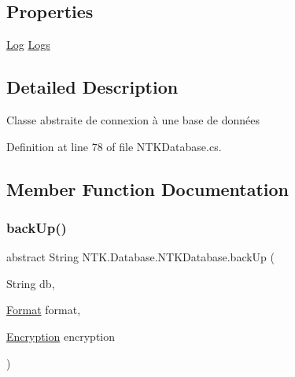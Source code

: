 \subsection*{Properties}
\begin{DoxyCompactItemize}
\item 
\mbox{\hyperlink{class_n_t_k_1_1_i_o_1_1_log}{Log}} \mbox{\hyperlink{class_n_t_k_1_1_database_1_1_n_t_k_database_a6f78c025e2cfbf38d4916287ea9e8742}{Logs}}
\end{DoxyCompactItemize}


\subsection{Detailed Description}
Classe abstraite de connexion à une base de données 



Definition at line 78 of file N\+T\+K\+Database.\+cs.



\subsection{Member Function Documentation}
\mbox{\label{class_n_t_k_1_1_database_1_1_n_t_k_database_ab43cae272b1c57b8819d73e182dd8dca}} 
\subsubsection{\texorpdfstring{backUp()}{backUp()}\hspace{0.1cm}{\footnotesize\ttfamily [1/2]}}
{\footnotesize\ttfamily abstract String N\+T\+K.\+Database.\+N\+T\+K\+Database.\+back\+Up (\begin{DoxyParamCaption}\item[{String}]{db,  }\item[{\mbox{\hyperlink{namespace_n_t_k_1_1_database_a9bed700210ca4ed5854002637b664789}{Format}}}]{format,  }\item[{\mbox{\hyperlink{namespace_n_t_k_1_1_database_aa21afe93187a6c77c4ccdc988b3c4ac2}{Encryption}}}]{encryption }\end{DoxyParamCaption})\hspace{0.3cm}{\ttfamily [pure virtual]}}







